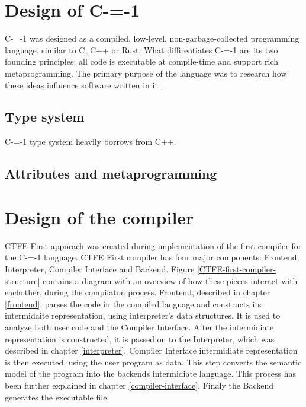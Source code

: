 \section{Design of C-=-1}
\label{language-design}

C-=-1 was designed as a compiled, low-level, non-garbage-collected programming language, similar to C, C++ or Rust.
What diffirentiates C-=-1 are its two founding principles: all code is executable at compile-time and support rich metaprogramming.
The primary purpose of the language was to research how these ideas influence software written in it \cite{grabski2022compilation}.

\subsection{Type system}

C-=-1 type system heavily borrows from C++.

\subsection{Attributes and metaprogramming}

\section{Design of the compiler}
\label{compiler-design}

CTFE First apporach was created during implementation of the first compiler for the C-=-1 language\cite{grabski2022compilation}.
CTFE First compiler has four major components: Frontend, Interpreter, Compiler Interface and Backend.
Figure \ref{CTFE-first-compiler-structure} contains a diagram with an overview of how these pieces interact with eachother, during the compilaton process.
Frontend, described in chapter \ref{frontend}, parses the code in the compiled language and constructs its intermidaite representation, using interpreter's data structures.
It is used to analyze both user code and the Compiler Interface.
After the intermidiate representation is constructed, it is passed on to the Interpreter, which was described in chapter \ref{interpreter}.
Compiler Interface intermidiate representation is then executed, using the user program as data. 
This step converts the semantic model of the program into the backends intermidiate language.
This process has been further explained in chapter \ref{compiler-interface}.
Finaly the Backend generates the executable file.

